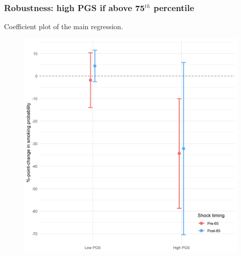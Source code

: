 \documentclass[10pt,compress,xcolor=dvipsnames,aspectratio=169]{beamer}    %
\newcounter{ex}
\newcommand{\1}[1]{\mathrm{1\hspace*{-2.5pt}l}[#1]}	%
\begin{document}
\begin{frame}
\frametitle{Robustness: high PGS if above 75$^{th}$ percentile}
Coefficient plot of the main regression.
\begin{figure}[hbtp]

\centering
\includegraphics[height=0.8\textheight]{../../3_output/shock_effects/robustness_6070_75pt_cv.png}
\label{fig:coeffplot75highPGS}
\end{figure}
\hyperlink{frame:robustness}{}
\end{frame}
\end{document}
